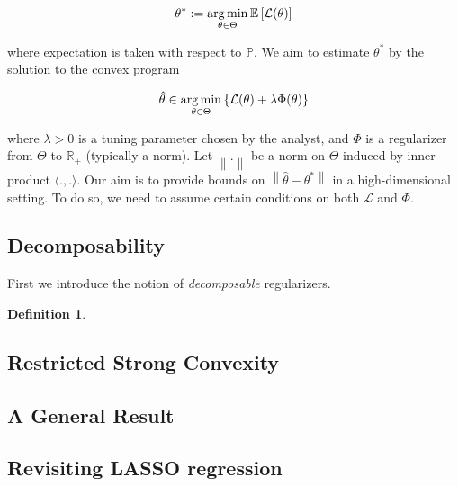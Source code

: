 \documentclass{article}
\newcommand{\R}{\mathbb{R}}
\newcommand{\bbP}{\mathbb{P}}
\newcommand{\cL}{\mathcal{L}}
\newcommand{\argmin}{\mathop{\rm arg\,min}}
\newcommand{\ev}[1]{\mathbb{E}\left[#1\right]}
\newcommand{\norm}[1]{\left\|#1\right\|}
\newcommand{\ip}[2]{\langle #1, #2 \rangle}
\newtheorem{definition}{Definition}
\begin{document}
$$\theta^{*} := \argmin_{\theta \in \Theta}\ev{\cL(\theta)}$$

where expectation is taken with respect to $\bbP$. We aim to estimate $\theta^{*}$ by the solution to the convex program

$$\hat{\theta} \in \argmin_{\theta \in \Theta}\left\{\cL(\theta) + \lambda\Phi(\theta)\right\}$$

where $\lambda > 0$ is a tuning parameter chosen by the analyst, and $\Phi$ is a regularizer from $\Theta$ to $\R_{+}$ (typically a norm). Let $\norm{.}$ be a norm on $\Theta$ induced by inner product $\ip{.}{.}$. Our aim is to provide bounds on $\norm{\hat{\theta} - \theta^{*}}$ in a high-dimensional setting. To do so, we need to assume certain conditions on both $\cL$ and $\Phi$.

\subsection{Decomposability}

First we introduce the notion of \textit{decomposable} regularizers.

\begin{definition}

\end{definition}


\subsection{Restricted Strong Convexity}

\subsection{A General Result}

\subsection{Revisiting LASSO regression}
\end{document}
